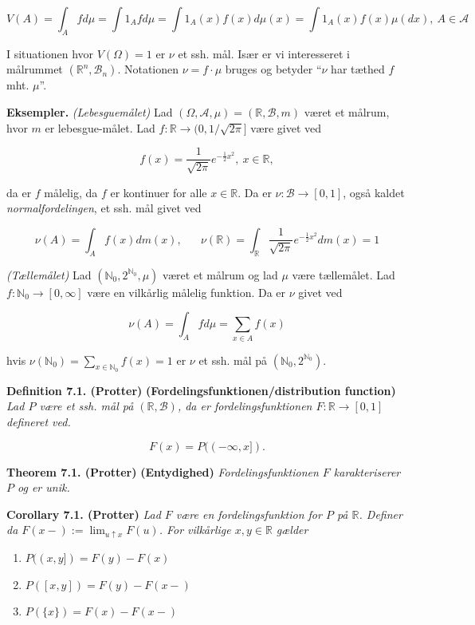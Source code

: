 \documentclass[a4paper,12pt,openany]{book}
\providecommand{\tightlist}{%
 \setlength{\itemsep}{0pt}\setlength{\parskip}{0pt}}
\begin{document}
\[
V(A)=\int_A f d\mu=\int 1_A fd\mu=\int 1_A(x)f(x)d\mu(x)=\int1_A(x)f(x)\mu(dx),\ A\in\mathcal{A}
\]

I situationen hvor \(V(\Omega)=1\) er \(\nu\) et ssh. mål. Især er vi interesseret i målrummet \((\mathbb{R}^n,\mathcal{B}_n)\). Notationen \(\nu =f\cdot \mu\) bruges og betyder ``\(\nu\) har tæthed \(f\) mht. \(\mu\)''.

\textbf{Eksempler.} \emph{(Lebesguemålet)} Lad \((\Omega,\mathcal{A},\mu)=(\mathbb{R},\mathcal{B},m)\) været et målrum, hvor \(m\) er lebesgue-målet. Lad \(f : \mathbb{R}\to (0,1/\sqrt{2\pi}]\) være givet ved

\[
f(x)=\frac{1}{\sqrt{2\pi}}e^{-\frac{1}{2}x^2},\ x\in\mathbb{R},
\]

da er \(f\) målelig, da \(f\) er kontinuer for alle \(x\in\mathbb{R}\). Da er \(\nu : \mathcal{B} \to [0,1]\), også kaldet \emph{normalfordelingen}, et ssh. mål givet ved

\[
\nu(A)=\int_A f(x) dm(x),\hspace{20pt} \nu(\mathbb{R})=\int_{\mathbb{R}}\frac{1}{\sqrt{2\pi}}e^{-\frac{1}{2}x^2}dm(x)=1
\]

\emph{(Tællemålet)} Lad \((\mathbb{N}_0,2^{\mathbb{N}_0},\mu)\) været et målrum og lad \(\mu\) være tællemålet. Lad \(f : \mathbb{N}_0 \to [0,\infty]\) være en vilkårlig målelig funktion. Da er \(\nu\) givet ved

\[
\nu(A)=\int_A fd\mu=\sum_{x\in A}f(x)
\]

hvis \(\nu(\mathbb{N}_0)=\sum_{x\in\mathbb{N}_0}f(x)=1\) er \(\nu\) et ssh. mål på \((\mathbb{N}_0,2^{\mathbb{N}_0})\).

\textbf{Definition 7.1. (Protter)} \textbf{(Fordelingsfunktionen/distribution function)} \emph{Lad \(P\) være et ssh. mål på \((\mathbb{R},\mathcal{B})\), da er fordelingsfunktionen \(F : \mathbb{R}\to [0,1]\) defineret ved.}

\[
F(x)=P((-\infty,x]).
\]

\textbf{Theorem 7.1. (Protter)} \textbf{(Entydighed)} \emph{Fordelingsfunktionen \(F\) karakteriserer \(P\) og er unik.}

\textbf{Corollary 7.1. (Protter)} \emph{Lad \(F\) være en fordelingsfunktion for \(P\) på \(\mathbb{R}\). Definer da \(F(x-):=\lim_{u\uparrow x}F(u)\). For vilkårlige \(x,y\in\mathbb{R}\) gælder}

\begin{enumerate}
\def\labelenumi{\roman{enumi}.}
\tightlist
\item
  \(P((x,y])=F(y)-F(x)\)
\item
  \(P([x,y])=F(y)-F(x-)\)
\item
  \(P(\{x\})=F(x)-F(x-)\)
\end{enumerate}
\end{document}

